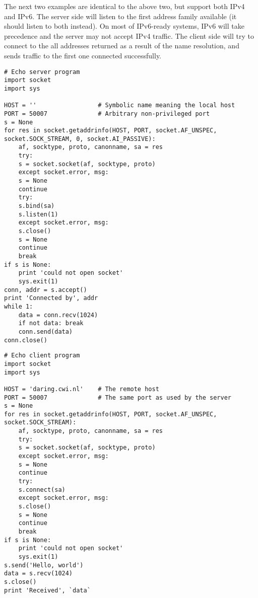 The next two examples are identical to the above two, but support both
IPv4 and IPv6.
The server side will listen to the first address family available
(it should listen to both instead).
On most of IPv6-ready systems, IPv6 will take precedence
and the server may not accept IPv4 traffic.
The client side will try to connect to the all addresses returned as a result
of the name resolution, and sends traffic to the first one connected
successfully.

\begin{verbatim}
# Echo server program
import socket
import sys

HOST = ''                 # Symbolic name meaning the local host
PORT = 50007              # Arbitrary non-privileged port
s = None
for res in socket.getaddrinfo(HOST, PORT, socket.AF_UNSPEC, socket.SOCK_STREAM, 0, socket.AI_PASSIVE):
    af, socktype, proto, canonname, sa = res
    try:
	s = socket.socket(af, socktype, proto)
    except socket.error, msg:
	s = None
	continue
    try:
	s.bind(sa)
	s.listen(1)
    except socket.error, msg:
	s.close()
	s = None
	continue
    break
if s is None:
    print 'could not open socket'
    sys.exit(1)
conn, addr = s.accept()
print 'Connected by', addr
while 1:
    data = conn.recv(1024)
    if not data: break
    conn.send(data)
conn.close()
\end{verbatim}

\begin{verbatim}
# Echo client program
import socket
import sys

HOST = 'daring.cwi.nl'    # The remote host
PORT = 50007              # The same port as used by the server
s = None
for res in socket.getaddrinfo(HOST, PORT, socket.AF_UNSPEC, socket.SOCK_STREAM):
    af, socktype, proto, canonname, sa = res
    try:
	s = socket.socket(af, socktype, proto)
    except socket.error, msg:
	s = None
	continue
    try:
	s.connect(sa)
    except socket.error, msg:
	s.close()
	s = None
	continue
    break
if s is None:
    print 'could not open socket'
    sys.exit(1)
s.send('Hello, world')
data = s.recv(1024)
s.close()
print 'Received', `data`
\end{verbatim}
